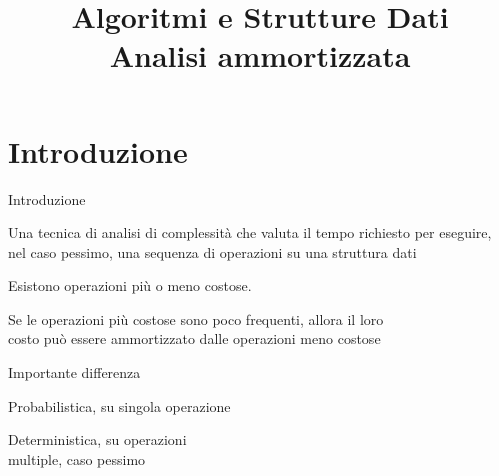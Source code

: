 

\graphicspath{{figs/02/}}



\title[ASD - Analisi ammortizzata]{\textbf{Algoritmi e Strutture Dati}\\[24pt]Analisi ammortizzata}

\FrameTitle{}

\FrameContent

\section{Introduzione}

\begin{frame}{Introduzione}

\vspace{-9pt}
\begin{myboxtitle}
Una tecnica di analisi di complessità che valuta il tempo richiesto per eseguire, \alert{nel caso pessimo}, una sequenza di operazioni
su una struttura dati
\BI
\item Esistono operazioni più o meno costose.
\item Se le operazioni più costose sono poco frequenti, allora il loro\\ costo può essere \alert{ammortizzato} dalle operazioni
meno costose
\EI
\end{myboxtitle}

\bigskip
Importante differenza
\BI
\item {}
\parbox[t]{7cm}{Probabilistica, su singola operazione}
\item {}
\parbox[t]{7cm}{Deterministica, su operazioni\\ multiple, caso pessimo}
\EI

\end{frame}



